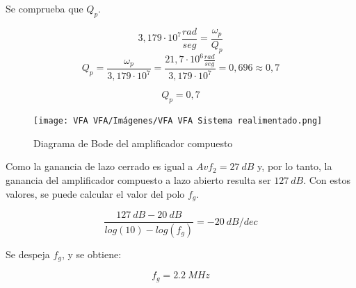 \bigskip
\hspace{1mm} Se comprueba que \( Q_p \).

\begin{equation}
    3,179 \cdot 10^7 \frac{rad}{seg} = \frac{\omega_p}{Q_p} 
\end{equation}
\begin{equation}
    Q_p = \frac{\omega_p}{3,179 \cdot 10^7} = \frac{21,7 \cdot 10^6 \frac{rad}{seg}}{3,179 \cdot 10^7} = 0,696 \approx 0,7
\end{equation}

\begin{equation}
    \boxed{
    Q_p = 0,7
    }
\end{equation}


\begin{figure}[!h]
    \centering
    \texttt{[image: VFA VFA/Imágenes/VFA VFA Sistema realimentado.png]}
    \caption{Diagrama de Bode del amplificador compuesto}
\end{figure}

\hspace{1mm} Como la ganancia de lazo cerrado es igual a \(Avf_2=27~dB\) y, por lo tanto, la ganancia del amplificador compuesto a lazo abierto resulta ser \(127~dB\). Con estos valores, se puede calcular el valor del polo \(f_g\).

\begin{equation}
    \frac{127~dB-20~dB}{log(10)-log(f_g)}=-20~dB/dec
\end{equation}

\bigskip
\hspace{1mm} Se despeja \(f_g\), y se obtiene:

\begin{equation}
\boxed{
    f_g=2.2~MHz
}
\end{equation}

